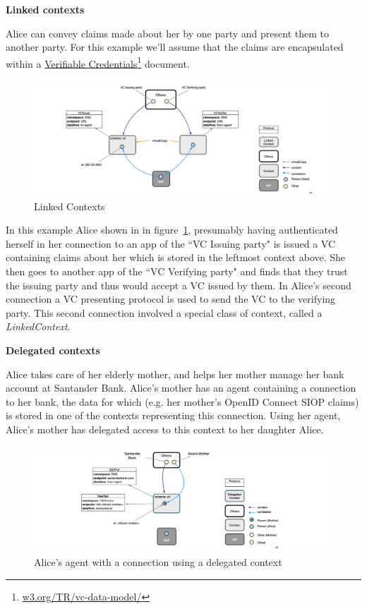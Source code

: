 \documentclass[11pt, oneside]{article}   	%
\newcommand{\hyperfootnote}[1][]{\def\ArgI{{#1}}\hyperfootnoteRelay}
\newcommand\hyperfootnoteRelay[2][]{\href{#1#2}{\ArgI}\footnote{\href{#1#2}{#2}}}
\begin{document}
\textbf{Linked contexts}

Alice can convey claims made about her by one party and present them to another party. For this example we'll assume that the claims are encapsulated within a \hyperfootnote[Verifiable Credentials][https://]{w3.org/TR/vc-data-model/} document. 

\begin{figure}[htbp]
\includegraphics[width=\textwidth]{./images/linked-contexts.png}
\caption{Linked Contexts}
\label{fig:linked-contexts}
\end{figure}

In this example Alice shown in in figure~\ref{fig:linked-contexts}, presumably having authenticated herself in her connection to an app of the ``VC Issuing party" is issued a VC containing claims about her which is stored in the leftmost context above. She then goes to another app of the ``VC Verifying party" and finds that they trust the issuing party and thus would accept a VC issued by them. In Alice's second connection a VC presenting protocol is used to send the VC to the verifying party. This second connection involved a special class of context, called a \emph{LinkedContext}. 

\textbf{Delegated contexts}

Alice takes care of her elderly mother, and helps her mother manage her bank account at Santander Bank. Alice's mother has an agent containing a connection to her bank, the data for which (e.g. her mother's OpenID Connect SIOP claims) is stored in one of the contexts representing this connection. Using her agent, Alice's mother has delegated access to this context to her daughter Alice.

\begin{figure}[htbp]
\includegraphics[width=\textwidth]{./images/delegated-contexts.png}
\caption{Alice's agent with a connection using a delegated context}
\label{fig:delegated-contexts}
\end{figure}
\end{document}
